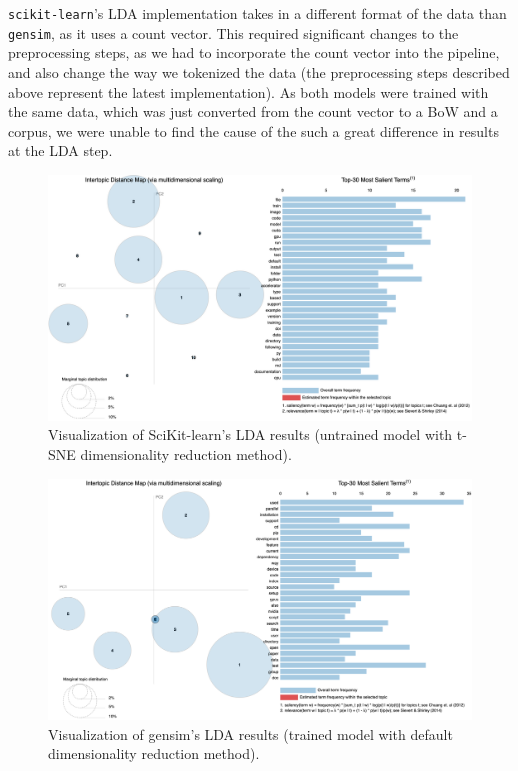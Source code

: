 \documentclass[conference, onecolumn]{IEEEtran}
\begin{document}
\verb|scikit-learn|'s LDA implementation takes in a different format of the
data than \verb|gensim|, as it uses a count vector.
This required significant changes to the preprocessing steps, as we had to
incorporate the count vector into the pipeline, and also change the way we
tokenized the data (the preprocessing steps described above represent the
latest implementation).
As both models were trained with the same data, which was just converted from
the count vector to a BoW and a corpus, we were unable to find the cause of the
such a great difference in results at the LDA step.

\begin{figure}[H]
    \centering
    \includegraphics[width=0.95\linewidth]{sklearn-default.png}
    \caption{Visualization of SciKit-learn's LDA results (untrained model with
        t-SNE dimensionality reduction method).}
    \label{fig:lda_sklearn_untrained_mds}
\end{figure}

\begin{figure}[H]
    \centering
    \includegraphics[width=0.95\linewidth]{gensim.png}
    \caption{Visualization of gensim's LDA results (trained model with default
        dimensionality reduction method).}
    \label{fig:lda_gensim}
\end{figure}
\end{document}
